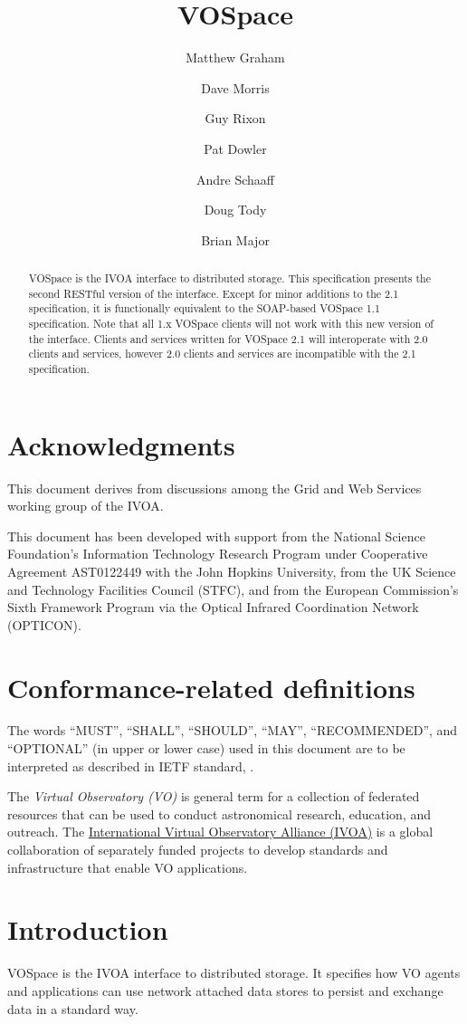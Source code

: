 \documentclass[11pt,a4paper]{ivoa}
\title{VOSpace}
\author{Matthew Graham}
\author{Dave Morris}
\author{Guy Rixon}
\author{Pat Dowler}
\author{Andre Schaaff}
\author{Doug Tody}
\author{Brian Major}
\begin{document}
\begin{abstract}
VOSpace is the IVOA interface to distributed storage. This specification presents the second RESTful version of the interface.  Except for minor additions to the 2.1 specification, it is functionally equivalent to the SOAP-based VOSpace 1.1 specification. Note that all 1.x VOSpace clients will not work with this new version of the interface.  Clients and services written for VOSpace 2.1 will interoperate with 2.0 clients and services, however 2.0 clients and services are incompatible with the 2.1 specification.
\end{abstract}

\section*{Acknowledgments}
\label{sec:acknowledgments}
This document derives from discussions among the Grid and Web Services working group of the IVOA.

This document has been developed with support from the National Science Foundation's Information Technology Research Program under Cooperative Agreement AST0122449 with the John Hopkins University, from the UK Science and Technology Facilities Council (STFC), and from the European Commission's Sixth Framework Program via the Optical Infrared Coordination Network (OPTICON).

\section*{Conformance-related definitions}
\label{sec:conformance-related definitions}
The words ``MUST'', ``SHALL'', ``SHOULD'', ``MAY'', ``RECOMMENDED'', and
``OPTIONAL'' (in upper or lower case) used in this document are to be
interpreted as described in IETF standard, \citet{std:RFC2119}.

The \emph{Virtual Observatory (VO)} is
general term for a collection of federated resources that can be used
to conduct astronomical research, education, and outreach.
The \href{http://www.ivoa.net}{International
Virtual Observatory Alliance (IVOA)} is a global
collaboration of separately funded projects to develop standards and
infrastructure that enable VO applications.

\section{Introduction}
\label{sec:introduction}
VOSpace is the IVOA interface to distributed storage. It specifies how VO agents and applications can use network attached data stores to persist and exchange data in a standard way.
\end{document}
